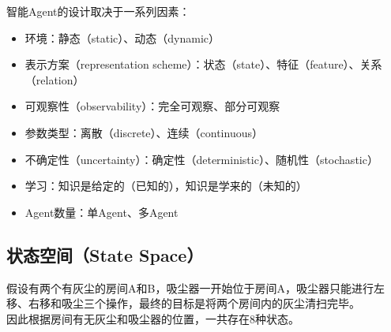 智能Agent的设计取决于一系列因素：

\begin{itemize}
    \item 环境：静态（static）、动态（dynamic）
    \item 表示方案（representation scheme）：状态（state）、特征（feature）、关系（relation）
    \item 可观察性（observability）：完全可观察、部分可观察
    \item 参数类型：离散（discrete）、连续（continuous）
    \item 不确定性（uncertainty）：确定性（deterministic）、随机性（stochastic）
    \item 学习：知识是给定的（已知的），知识是学来的（未知的）
    \item Agent数量：单Agent、多Agent
\end{itemize}

\vspace{0.5cm}

\subsection{状态空间（State Space）}

假设有两个有灰尘的房间A和B，吸尘器一开始位于房间A，吸尘器只能进行左移、右移和吸尘三个操作，最终的目标是将两个房间内的灰尘清扫完毕。\\

因此根据房间有无灰尘和吸尘器的位置，一共存在8种状态。\\

